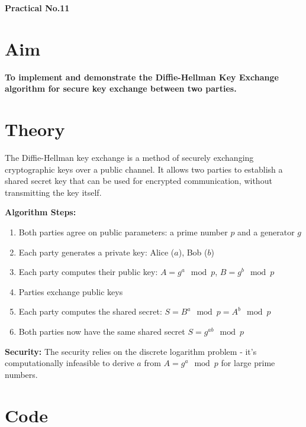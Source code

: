 \documentclass[a4paper,12pt]{article}
\begin{document}
\begin{center}
\Large\textbf{Practical No.11}
\end{center}

\section*{Aim}
\large\textbf{To implement and demonstrate the Diffie-Hellman Key Exchange algorithm for secure key exchange between two parties.}
\normalsize

\vspace{0.5cm}

\section*{Theory}
The Diffie-Hellman key exchange is a method of securely exchanging cryptographic keys over a public channel. It allows two parties to establish a shared secret key that can be used for encrypted communication, without transmitting the key itself.

\vspace{0.3cm}
\textbf{Algorithm Steps:}
\begin{enumerate}
\item Both parties agree on public parameters: a prime number $p$ and a generator $g$
\item Each party generates a private key: Alice ($a$), Bob ($b$)
\item Each party computes their public key: $A = g^a \mod p$, $B = g^b \mod p$
\item Parties exchange public keys
\item Each party computes the shared secret: $S = B^a \mod p = A^b \mod p$
\item Both parties now have the same shared secret $S = g^{ab} \mod p$
\end{enumerate}

\vspace{0.3cm}
\textbf{Security:} The security relies on the discrete logarithm problem - it's computationally infeasible to derive $a$ from $A = g^a \mod p$ for large prime numbers.

\section*{Code}
\end{document}
